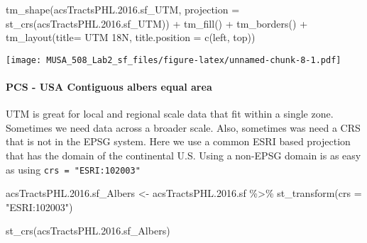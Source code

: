\documentclass[
]{article}
\newenvironment{Shaded}{\begin{snugshade}}{\end{snugshade}}
\newcommand{\AttributeTok}[1]{\textcolor[rgb]{0.77,0.63,0.00}{#1}}
\newcommand{\FloatTok}[1]{\textcolor[rgb]{0.00,0.00,0.81}{#1}}
\newcommand{\FunctionTok}[1]{\textcolor[rgb]{0.00,0.00,0.00}{#1}}
\newcommand{\NormalTok}[1]{#1}
\newcommand{\OtherTok}[1]{\textcolor[rgb]{0.56,0.35,0.01}{#1}}
\newcommand{\SpecialCharTok}[1]{\textcolor[rgb]{0.00,0.00,0.00}{#1}}
\newcommand{\StringTok}[1]{\textcolor[rgb]{0.31,0.60,0.02}{#1}}
\begin{document}
\begin{Shaded}
\begin{Highlighting}[]
\FunctionTok{tm\_shape}\NormalTok{(acsTractsPHL.}\FloatTok{2016.}\NormalTok{sf\_UTM, }
         \AttributeTok{projection =} \FunctionTok{st\_crs}\NormalTok{(acsTractsPHL.}\FloatTok{2016.}\NormalTok{sf\_UTM)) }\SpecialCharTok{+}
  \FunctionTok{tm\_fill}\NormalTok{() }\SpecialCharTok{+}
  \FunctionTok{tm\_borders}\NormalTok{() }\SpecialCharTok{+}
  \FunctionTok{tm\_layout}\NormalTok{(}\AttributeTok{title=} \StringTok{\textquotesingle{}UTM 18N\textquotesingle{}}\NormalTok{, }
            \AttributeTok{title.position =} \FunctionTok{c}\NormalTok{(}\StringTok{\textquotesingle{}left\textquotesingle{}}\NormalTok{, }\StringTok{\textquotesingle{}top\textquotesingle{}}\NormalTok{))}
\end{Highlighting}
\end{Shaded}

\texttt{[image: MUSA\_508\_Lab2\_sf\_files/figure-latex/unnamed-chunk-8-1.pdf]}

\hypertarget{pcs---usa-contiguous-albers-equal-area}{%
\paragraph{PCS - USA Contiguous albers equal
area}\label{pcs---usa-contiguous-albers-equal-area}}

UTM is great for local and regional scale data that fit within a single
zone. Sometimes we need data across a broader scale. Also, sometimes was
need a CRS that is not in the EPSG system. Here we use a common ESRI
based projection that has the domain of the continental U.S. Using a
non-EPSG domain is as easy as using \texttt{crs\ =\ "ESRI:102003"}

\begin{Shaded}
\begin{Highlighting}[]
\NormalTok{acsTractsPHL.}\FloatTok{2016.}\NormalTok{sf\_Albers }\OtherTok{\textless{}{-}}\NormalTok{ acsTractsPHL.}\FloatTok{2016.}\NormalTok{sf }\SpecialCharTok{\%\textgreater{}\%} 
  \FunctionTok{st\_transform}\NormalTok{(}\AttributeTok{crs =} \StringTok{"ESRI:102003"}\NormalTok{)}

\FunctionTok{st\_crs}\NormalTok{(acsTractsPHL.}\FloatTok{2016.}\NormalTok{sf\_Albers)}
\end{Highlighting}
\end{Shaded}
\end{document}
